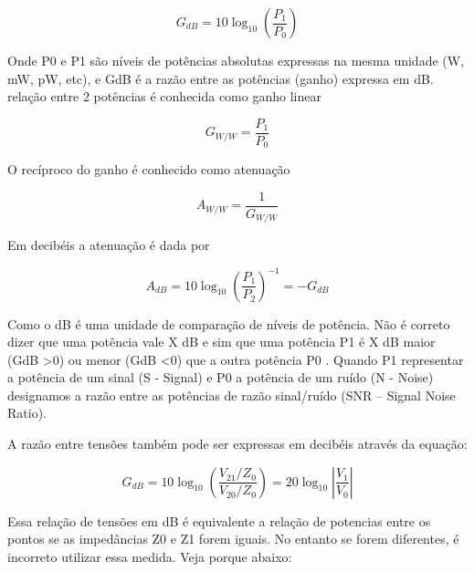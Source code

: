 \documentclass[
	article,			%
	11pt,				%
	oneside,			%
	a4paper,			%
	english,			%
	brazil,				%
	sumario=tradicional
	]{abntex2}
\begin{document}
    \begin{equation}
        {\displaystyle G_{dB}} = 10\log_{10}(\frac{{\displaystyle P_{1}}}{{\displaystyle P_{0}}})
    \end{equation}
    
         Onde P0 e P1 são níveis de potências absolutas expressas na mesma unidade (W, mW, pW, etc), e GdB é a razão entre as potências (ganho) expressa em dB. relação entre 2 potências é conhecida como ganho linear

    \begin{equation}
        {\displaystyle G_{W/W}} = \frac{{\displaystyle P_{1}}}{{\displaystyle P_{0}}}
    \end{equation}

        O recíproco do ganho é conhecido como atenuação
    
    \begin{equation}
        {\displaystyle A_{W/W}} = \frac{1}{{\displaystyle G_{W/W}}}
    \end{equation}

        Em decibéis a atenuação é dada por
        
     \begin{equation}
        {\displaystyle A_{dB}} = 10\log_{10}(\frac{{\displaystyle P_{1}}}{{\displaystyle P_{2}}})^{-1} =  {\displaystyle -G_{dB}}
    \end{equation}
    
        Como o dB é uma unidade de comparação de níveis de potência. Não é
    correto dizer que uma potência vale X dB e sim que uma potência P1
     é
    X dB maior (GdB >0) ou menor (GdB <0) que a outra potência P0
    .
    Quando P1
     representar a potência de um sinal (S - Signal) e P0
     a
    potência de um ruído (N - Noise) designamos a razão entre as
    potências de razão sinal/ruído (SNR – Signal Noise Ratio).
    
        A razão entre tensões também pode ser expressas em decibéis através
    da equação:
    
    \begin{equation}
    {\displaystyle G_{dB}} = 10\log_{10}(\frac{{\displaystyle V_{2 1}}/{\displaystyle Z_{0}}}{{\displaystyle V_{2 0}}/{\displaystyle Z_{0}}}) = 20\log_{10}|\frac{{\displaystyle V_{1}}}{{\displaystyle V_{0}}}|
        
    \end{equation}
    
        Essa relação de tensões em dB é equivalente a relação de potencias
    entre os pontos se as impedâncias Z0
     e Z1
     forem iguais. No entanto se
    forem diferentes, é incorreto utilizar essa medida. Veja porque abaixo:
    
\end{document}
